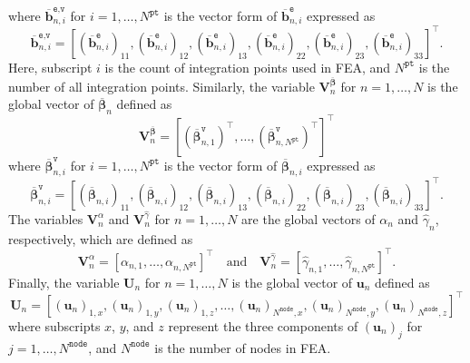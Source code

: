 \documentclass[preprint,11pt]{elsarticle}
\theoremstyle{definition}
\begin{document}
where $\overline{\mathbf{b}}_{n,i}^\texttt{e,v}$ for $i = 1, \ldots, N^\texttt{pt}$ is the vector form of $\overline{\mathbf{b}}_{n,i}^\texttt{e}$ expressed as
\begin{equation*}
    \overline{\mathbf{b}}_{n,i}^\texttt{e,v} = \left[ \left( \overline{\mathbf{b}}_{n,i}^\texttt{e} \right)_{11}, \left( \overline{\mathbf{b}}_{n,i}^\texttt{e} \right)_{12}, \left( \overline{\mathbf{b}}_{n,i}^\texttt{e} \right)_{13}, \left( \overline{\mathbf{b}}_{n,i}^\texttt{e} \right)_{22}, \left( \overline{\mathbf{b}}_{n,i}^\texttt{e} \right)_{23}, \left( \overline{\mathbf{b}}_{n,i}^\texttt{e} \right)_{33} \right]^\top.
\end{equation*}
Here, subscript $i$ is the count of integration points used in FEA, and $N^\texttt{pt}$ is the number of all integration points. Similarly, the variable $\mathbf{V}_n^{\overline{\boldsymbol{\beta}}}$ for $n=1,\ldots,N$ is the global vector of $\overline{\boldsymbol{\beta}}_n$ defined as
\begin{equation*}
    \mathbf{V}_n^{\overline{\boldsymbol{\beta}}} = \left[ \left(\overline{\boldsymbol{\beta}}_{n,1}^\texttt{v}\right)^\top, \ldots, \left(\overline{\boldsymbol{\beta}}_{n,N^\texttt{pt}}^\texttt{v}\right)^\top \right]^\top
\end{equation*}
where $\overline{\boldsymbol{\beta}}_{n,i}^\texttt{v}$ for $i = 1, \ldots, N^\texttt{pt}$ is the vector form of $\overline{\boldsymbol{\beta}}_{n,i}$ expressed as
\begin{equation*}
    \overline{\boldsymbol{\beta}}_{n,i}^\texttt{v} = \left[ \left( \overline{\boldsymbol{\beta}}_{n,i} \right)_{11},
    \left( \overline{\boldsymbol{\beta}}_{n,i} \right)_{12},
    \left( \overline{\boldsymbol{\beta}}_{n,i} \right)_{13},
    \left( \overline{\boldsymbol{\beta}}_{n,i} \right)_{22},
    \left( \overline{\boldsymbol{\beta}}_{n,i} \right)_{23},
    \left( \overline{\boldsymbol{\beta}}_{n,i} \right)_{33} \right]^\top.
\end{equation*}
The variables $\mathbf{V}_n^\alpha$ and $\mathbf{V}_n^{\widehat{\gamma}}$ for $n=1,\ldots,N$ are the global vectors of $\alpha_n$ and $\widehat{\gamma}_n$, respectively, which are defined as
\begin{equation*}
    \mathbf{V}_n^\alpha = \left[ \alpha_{n,1}, \ldots, \alpha_{n,N^\texttt{pt}} \right]^\top
    \quad \text{and} \quad
    \mathbf{V}_n^{\widehat{\gamma}} = \left[ \widehat{\gamma}_{n,1}, \ldots, \widehat{\gamma}_{n,N^\texttt{pt}} \right]^\top.
\end{equation*}
Finally, the variable $\mathbf{U}_n$ for $n=1,\ldots,N$ is the global vector of $\mathbf{u}_n$ defined as
\begin{equation*}
    \mathbf{U}_n = \left[ (\mathbf{u}_n)_{1,x}, (\mathbf{u}_n)_{1,y}, (\mathbf{u}_n)_{1,z}, \ldots, (\mathbf{u}_n)_{N^\texttt{node},x}, (\mathbf{u}_n)_{N^\texttt{node},y}, (\mathbf{u}_n)_{N^\texttt{node},z} \right]^\top
\end{equation*}
where subscripts $x$, $y$, and $z$ represent the three components of $(\mathbf{u}_n)_j$ for $j=1,\ldots,N^\texttt{node}$, and $N^\texttt{node}$ is the number of nodes in FEA.
\end{document}
